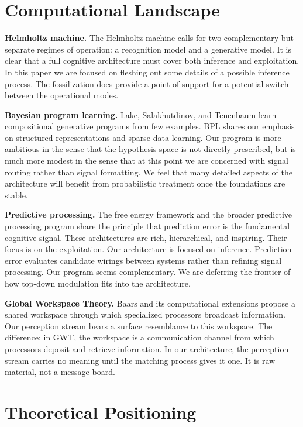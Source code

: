 \documentclass[12pt, a4paper]{article}
\begin{document}
\section{Computational Landscape}

\textbf{Helmholtz machine.} The Helmholtz machine \cite{dayan1995} calls
for two complementary but separate regimes of operation: a recognition
model and a generative model. It is clear that a full cognitive
architecture must cover both inference and exploitation. In this paper
we are focused on fleshing out some details of a possible inference
process. The fossilization does provide a point of support for a
potential switch between the operational modes.

\textbf{Bayesian program learning.} Lake, Salakhutdinov, and Tenenbaum
\cite{lake2015} learn compositional generative programs from few
examples. BPL shares our emphasis on structured representations and
sparse-data learning. Our program is more ambitious in the sense that
the hypothesis space is not directly prescribed, but is much more modest
in the sense that at this point we are concerned with signal routing
rather than signal formatting. We feel that many detailed aspects of
the architecture will benefit from probabilistic treatment once the
foundations are stable.

\textbf{Predictive processing.} The free energy framework
\cite{friston2010} and the broader predictive processing program
\cite{clark2013} share the principle that prediction error is the
fundamental cognitive signal. These architectures are rich, hierarchical,
and inspiring. Their focus is on the exploitation. Our architecture is
focused on inference. Prediction error evaluates candidate wirings
between systems rather than refining signal processing. Our program
seems complementary. We are deferring the frontier of how top-down
modulation fits into the architecture.

\textbf{Global Workspace Theory.} Baars \cite{baars1988} and its
computational extensions \cite{dehaene2011} propose a shared workspace
through which specialized processors broadcast information. Our
perception stream bears a surface resemblance to this workspace. The
difference: in GWT, the workspace is a communication channel from which
processors deposit and retrieve information. In our architecture, the
perception stream carries no meaning until the matching process gives
it one. It is raw material, not a message board.

\section{Theoretical Positioning}
\end{document}
